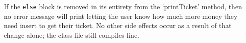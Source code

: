 If the \verb|else| block is removed in its entirety from the
`printTicket' method, then no error message will print letting the user
know how much more money they need insert to get their ticket. No other
side effects occur as a result of that change alone; the class file
still compiles fine.
